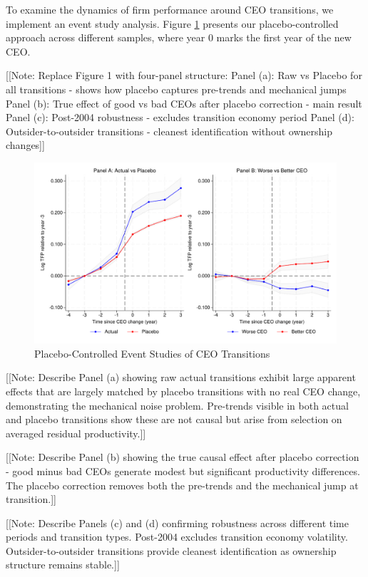 \documentclass[11pt,a4paper]{article}
\begin{document}
To examine the dynamics of firm performance around CEO transitions, we implement an event study analysis. Figure \ref{fig:event_study_main} presents our placebo-controlled approach across different samples, where year 0 marks the first year of the new CEO.

[[Note: Replace Figure 1 with four-panel structure:
Panel (a): Raw vs Placebo for all transitions - shows how placebo captures pre-trends and mechanical jumps
Panel (b): True effect of good vs bad CEOs after placebo correction - main result
Panel (c): Post-2004 robustness - excludes transition economy period
Panel (d): Outsider-to-outsider transitions - cleanest identification without ownership changes]]

\begin{figure}[htbp]
\centering
\includegraphics[width=\textwidth]{figure/event_study.pdf}
\caption{Placebo-Controlled Event Studies of CEO Transitions}
\label{fig:event_study_main}
\end{figure}

[[Note: Describe Panel (a) showing raw actual transitions exhibit large apparent effects that are largely matched by placebo transitions with no real CEO change, demonstrating the mechanical noise problem. Pre-trends visible in both actual and placebo transitions show these are not causal but arise from selection on averaged residual productivity.]]

[[Note: Describe Panel (b) showing the true causal effect after placebo correction - good minus bad CEOs generate modest but significant productivity differences. The placebo correction removes both the pre-trends and the mechanical jump at transition.]]

[[Note: Describe Panels (c) and (d) confirming robustness across different time periods and transition types. Post-2004 excludes transition economy volatility. Outsider-to-outsider transitions provide cleanest identification as ownership structure remains stable.]]
\end{document}
